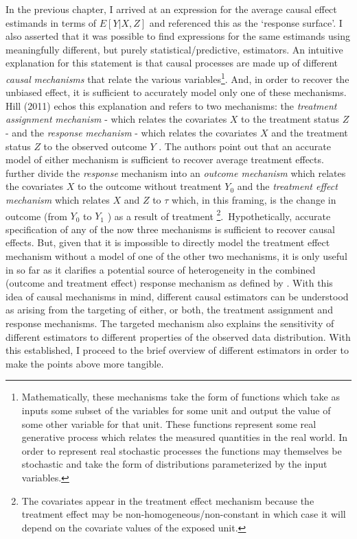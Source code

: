 \documentclass[../main.tex]{subfiles}
\begin{document}
\vspace{\baselineskip}
In the previous chapter, I arrived at an expression for the average causal effect estimands in terms of  \( E \left[ Y  \vert  X, Z \right]  \)  and referenced this as the ‘response surface’. I also asserted that it was possible to find expressions for the same estimands using meaningfully different, but purely statistical/predictive, estimators. An intuitive explanation for this statement is that causal processes are made up of different \textit{causal} \textit{mechanisms} that relate the various variables\footnote{ Mathematically, these mechanisms take the form of functions which take as inputs some subset of the variables for some unit and output the value of some other variable for that unit. These functions represent some real generative process which relates the measured quantities in the real world. In order to represent real stochastic processes the functions may themselves be stochastic and take the form of distributions parameterized by the input variables. }. And, in order to recover the unbiased effect, it is sufficient to accurately model only one of these mechanisms. Hill (2011) echos this explanation and refers to two mechanisms: the \textit{treatment assignment} \textit{mechanism} - which relates the covariates  \( X \) to the treatment status  \( Z \)  - and the \textit{response} \textit{mechanism} - which relates the covariates  \( X \)  and the treatment status  \( Z \)  to the observed outcome  \( Y \) . The authors point out that an accurate model of either mechanism is sufficient to recover average treatment effects. \cite{Kunzel2019MetalearnersLearning} further divide the \textit{response} mechanism into an \textit{outcome mechanism} which relates the covariates  \( X \) to the outcome without treatment  \( Y_{0} \) and the \textit{treatment effect mechanism} which relates  \( X \) and  \( Z \) to  \(  \tau \) which, in this framing, is the change in outcome (from  \( Y_{0} \) to  \( Y_{1} \) ) as a result of treatment \footnote{ The covariates appear in the treatment effect mechanism because the treatment effect may be non-homogeneous/non-constant in which case it will depend on the covariate values of the exposed unit. }.\  Hypothetically, accurate specification of any of the now three mechanisms is sufficient to recover causal effects. But, given that it is impossible to directly model the treatment effect mechanism without a model of one of the other two mechanisms, it is only useful in so far as it clarifies a potential source of heterogeneity in the combined (outcome and treatment effect) response mechanism as defined by \cite{Hill2011BayesianInference}. With this idea of causal mechanisms in mind, different causal estimators can be understood as arising from the targeting of either, or both, the treatment assignment and response mechanisms. The targeted mechanism also explains the sensitivity of different estimators to different properties of the observed data distribution. With this established, I proceed to the brief overview of different estimators in order to make the points above more tangible.\par
\end{document}
